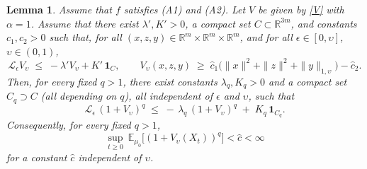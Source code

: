 \documentclass[11pt, a4paper,leqno]{amsart}
\newtheorem{lemma}{Lemma}[section]
\theoremstyle{definition}
\numberwithin{equation}{section}
\newcommand{\R}{\mathbb R}
\begin{document}
\begin{lemma}\label{lem:power-fixedq}
Assume that $f$ satisfies \textnormal{(A1)} and \textnormal{(A2)}. Let $V$ be given by \eqref{V} with $\alpha=1$. Assume that there exist
$\lambda',K'>0$, a compact set $C\subset\R^{3m}$, and constants $c_1,c_2>0$ such that, for all $(x,z,y)\in \mathbb{R}^m \times \mathbb{R}^m \times \mathbb{R}^m$, and for all $\epsilon\in [0,\upsilon]$, $\upsilon\in (0,1)$,
\[
{\mathcal L_\epsilon}V_\upsilon \;\le\; -\lambda' V_\upsilon + K'\,\mathbf 1_{C},
\qquad
V_\upsilon(x,z,y)\;\ge\; \hat c_1\bigl(\|x\|^2+\|z\|^2+\|y\|_{1,\upsilon}\bigr)-\hat c_2.
\]
Then, for every fixed $q>1$, there exist constants
$\lambda_q,K_q>0$ and a compact set $C_q\supset C$ (all depending on $q$), all independent of $\epsilon$ and $\upsilon$, such that
\begin{equation}\label{eq:powerq-drift+}
{\mathcal L_\epsilon}\,(1+V_\upsilon)^q \;\le\; -\,\lambda_q\,(1+V_\upsilon)^q \;+\; K_q\,\mathbf 1_{C_q}.
\end{equation}
Consequently, for every fixed $q>1$,
\begin{equation}\label{eq:powerq-drift+aa}
\sup_{t\ge0}\ \mathbb E_{\mu_0}\bigl[(1+V_\upsilon( X_t))^q \bigr]<\hat c<\infty
\end{equation}
for a constant $\hat c$ independent of $\upsilon$.
\end{lemma}
\end{document}
